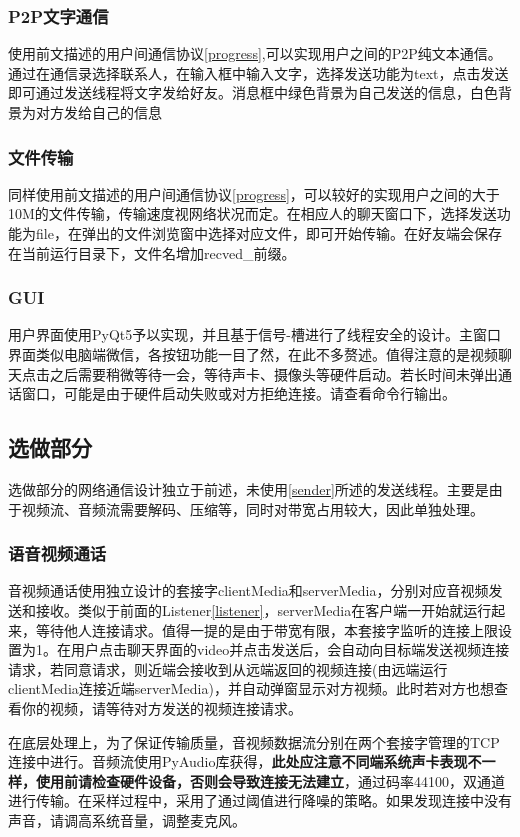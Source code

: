 \documentclass[UTF8]{ctexart}
\begin{document}
\subsubsection{P2P文字通信}
使用前文描述的用户间通信协议\ref{progress},可以实现用户之间的P2P纯文本通信。通过在通信录选择联系人，在输入框中输入文字，选择发送功能为text，点击发送即可通过发送线程将文字发给好友。消息框中绿色背景为自己发送的信息，白色背景为对方发给自己的信息

\subsubsection{文件传输}
同样使用前文描述的用户间通信协议\ref{progress}，可以较好的实现用户之间的大于10M的文件传输，传输速度视网络状况而定。在相应人的聊天窗口下，选择发送功能为file，在弹出的文件浏览窗中选择对应文件，即可开始传输。在好友端会保存在当前运行目录下，文件名增加recved\_前缀。
\subsubsection{GUI}
用户界面使用PyQt5予以实现，并且基于信号-槽进行了线程安全的设计。主窗口界面类似电脑端微信，各按钮功能一目了然，在此不多赘述。值得注意的是视频聊天点击之后需要稍微等待一会，等待声卡、摄像头等硬件启动。若长时间未弹出通话窗口，可能是由于硬件启动失败或对方拒绝连接。请查看命令行输出。

\subsection{选做部分}
选做部分的网络通信设计独立于前述，未使用\ref{sender}所述的发送线程。主要是由于视频流、音频流需要解码、压缩等，同时对带宽占用较大，因此单独处理。
\subsubsection{语音视频通话}
音视频通话使用独立设计的套接字clientMedia和serverMedia，分别对应音视频发送和接收。类似于前面的Listener\ref{listener}，serverMedia在客户端一开始就运行起来，等待他人连接请求。值得一提的是由于带宽有限，本套接字监听的连接上限设置为1。在用户点击聊天界面的video并点击发送后，会自动向目标端发送视频连接请求，若同意请求，则近端会接收到从远端返回的视频连接(由远端运行clientMedia连接近端serverMedia)，并自动弹窗显示对方视频。此时若对方也想查看你的视频，请等待对方发送的视频连接请求。

在底层处理上，为了保证传输质量，音视频数据流分别在两个套接字管理的TCP连接中进行。音频流使用PyAudio库获得，\textbf{此处应注意不同端系统声卡表现不一样，使用前请检查硬件设备，否则会导致连接无法建立}，通过码率44100，双通道进行传输。在采样过程中，采用了通过阈值进行降噪的策略。如果发现连接中没有声音，请调高系统音量，调整麦克风。
\end{document}
